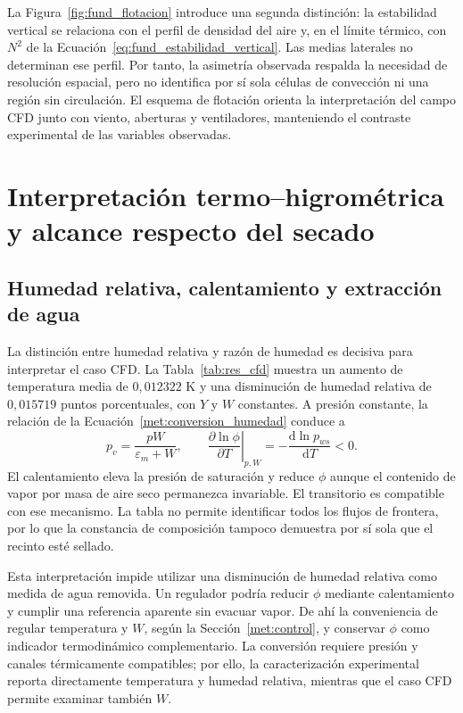 La Figura~\ref{fig:fund_flotacion} introduce una segunda distinción: la estabilidad vertical se relaciona con el perfil de densidad del aire y, en el límite térmico, con $N^2$ de la Ecuación~\eqref{eq:fund_estabilidad_vertical}. Las medias laterales no determinan ese perfil. Por tanto, la asimetría observada respalda la necesidad de resolución espacial, pero no identifica por sí sola células de convección ni una región sin circulación. El esquema de flotación orienta la interpretación del campo CFD junto con viento, aberturas y ventiladores, manteniendo el contraste experimental de las variables observadas.
\FloatBarrier

\section{Interpretación termo--higrométrica y alcance respecto del secado}
\label{dis:psicrometria}

\subsection{Humedad relativa, calentamiento y extracción de agua}

La distinción entre humedad relativa y razón de humedad es decisiva para interpretar el caso CFD. La Tabla~\ref{tab:res_cfd} muestra un aumento de temperatura media de $0{,}012322$ K y una disminución de humedad relativa de $0{,}015719$ puntos porcentuales, con $Y$ y $W$ constantes. A presión constante, la relación de la Ecuación~\eqref{met:conversion_humedad} conduce a
\begin{equation}
p_v=\frac{pW}{\varepsilon_m+W},\qquad
\left.\frac{\partial\ln\phi}{\partial T}\right|_{p,W}
=-\frac{\mathrm d\ln p_{ws}}{\mathrm dT}<0.
\label{eq:dis_humedad_calentamiento}
\end{equation}
El calentamiento eleva la presión de saturación y reduce $\phi$ aunque el contenido de vapor por masa de aire seco permanezca invariable. El transitorio es compatible con ese mecanismo. La tabla no permite identificar todos los flujos de frontera, por lo que la constancia de composición tampoco demuestra por sí sola que el recinto esté sellado.

Esta interpretación impide utilizar una disminución de humedad relativa como medida de agua removida. Un regulador podría reducir $\phi$ mediante calentamiento y cumplir una referencia aparente sin evacuar vapor. De ahí la conveniencia de regular temperatura y $W$, según la Sección~\ref{met:control}, y conservar $\phi$ como indicador termodinámico complementario. La conversión requiere presión y canales térmicamente compatibles; por ello, la caracterización experimental reporta directamente temperatura y humedad relativa, mientras que el caso CFD permite examinar también $W$.


